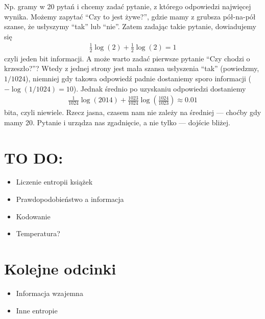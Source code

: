 \documentclass[10pt,a4paper]{article}
\begin{document}
Np. gramy w 20 pytań i chcemy zadać pytanie, z którego odpowiedzi najwięcej wynika.
Możemy zapytać ``Czy to jest żywe?'', gdzie mamy z grubsza pół-na-pół szanse, że usłyszymy ``tak'' lub ``nie''.
Zatem zadając takie pytanie, dowiadujemy się
%
\begin{align}
    \tfrac{1}{2} \log(2) + \tfrac{1}{2} \log(2)  = 1
\end{align}
%
czyli jeden bit informacji. 
A może warto zadać pierwsze pytanie ``Czy chodzi o krzeszło?''?
Wtedy z jednej strony jest mała szansa usłyszenia ``tak'' (powiedzmy, $1/1024$),
niemniej gdy takowa odpowiedź padnie dostaniemy sporo informacji  ($-\log(1/1024)=10$).
Jednak średnio po uzyskaniu odpowiedzi dostaniemy
%
\begin{align}
    \tfrac{1}{1024} \log(2014) + \tfrac{1023}{1024} \log(\tfrac{1024}{1023}) \approx 0.01
\end{align}
%
bita, czyli niewiele.
Rzecz jasna, czasem nam nie zależy na średniej --- choćby gdy mamy 20.
Pytanie i urządza nas zgadnięcie, a nie tylko --- dojście bliżej.

\section{TO DO:}

\begin{itemize}
    \item Liczenie entropii książek
    \item Prawdopodobieństwo a informacja
    \item Kodowanie
    \item Temperatura?
\end{itemize}

\section{Kolejne odcinki}

\begin{itemize}
    \item Informacja wzajemna
    \item Inne entropie
\end{itemize}


\end{document}
